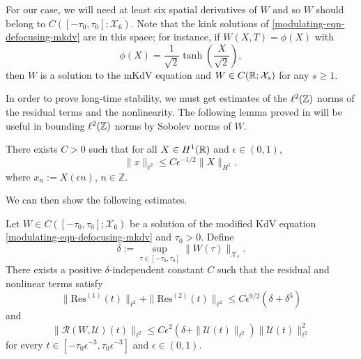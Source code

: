 For our case, we will need at least six spatial derivatives of \(W\) and so \(W\) should belong to \(C([-\tau_0,\tau_0];\mathcal X_6)\). Note that the kink solutions of \cref{modulating-eqn-defocusing-mkdv} are in this space; for instance, if \(W(X,T) = \phi(X)\) with 
\begin{equation}
	\phi(X) = \frac 1 {\sqrt 2} \tanh\left( \frac X {\sqrt{2}} \right),
\end{equation}
then \(W\) is a solution to the mKdV equation and \(W \in C(\mathbb{R} ; \mathcal X_s)\) for any \(s\geq 1\).

In order to prove long-time stability, we must get estimates of the \(\ell^2(\mathbb{Z})\) norms of the residual terms and the nonlinearity. The following lemma proved in \cite{dumas2014justification} will be useful in bounding \(\ell^2(\mathbb{Z})\) norms by Sobolev norms of \(W\).

\begin{lem}
	There exists \(C>0\) such that for all \(X \in H^1(\mathbb{R})\) and \(\epsilon \in (0,1)\), \[\|x\|_{\ell^2} \leq C \epsilon^{-1/2} \|X\|_{H^1},\] where \(x_n := X(\epsilon n)\), \(n\in \mathbb Z\).
\end{lem}

We can then show the following estimates.

\begin{lem}\label{residual-nonlinear-estimates}
	Let \(W\in C([-\tau_0,\tau_0];\mathcal X_6)\) be a solution of the modified KdV equation \cref{modulating-eqn-defocusing-mkdv} and \(\tau_0>0\). Define
	\begin{equation}\label{delta-0-defn}
		\delta:= \sup_{\tau\in[-\tau_0,\tau_0]} \| W(\tau)\|_{\mathcal X_s}.
	\end{equation}
	There exists a positive \(\delta\)-independent constant \(C\) such that the residual and nonlinear terms satisfy
	\begin{equation}
		\| \mathrm{Res}^{(1)}(t) \|_{\ell^2} + \|\mathrm{Res}^{(2)}(t) \|_{\ell^2} \leq C \epsilon^{9/2} (\delta + \delta^5)
	\end{equation}
	and 
	\begin{equation}
		\|\mathcal R(W,\mathcal U)(t) \|_{\ell^2} \leq C \epsilon^2(\delta + \| \mathcal U(t) \|_{\ell^2}) \|\mathcal U (t)\|_{\ell^2}^2
	\end{equation}
	for every \(t \in [-\tau_0\epsilon^{-3}, \tau_0\epsilon^{-3}]\) and \(\epsilon \in (0,1).\)
\end{lem}
	

